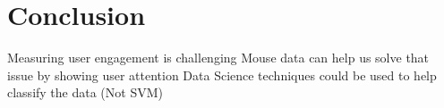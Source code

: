 \documentclass{article}
\begin{document}
\section{Conclusion}

Measuring user engagement is challenging
Mouse data can help us solve that issue by showing user attention
Data Science techniques could be used to help classify the data (Not SVM)


\printbibliography
\end{document}
